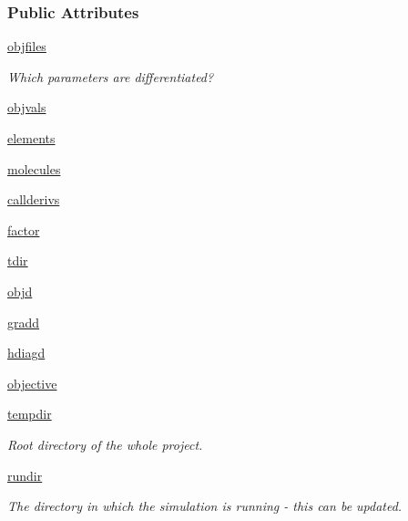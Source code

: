 \subsubsection*{\-Public \-Attributes}
\begin{DoxyCompactItemize}
\item 
\hyperlink{classforcebalance_1_1psi4io_1_1RDVR3__Psi4_af0a836ea0484e543c42795a4ac6f9aed}{objfiles}
\begin{DoxyCompactList}\small\item\em \-Which parameters are differentiated? \end{DoxyCompactList}\item 
\hyperlink{classforcebalance_1_1psi4io_1_1RDVR3__Psi4_ab49315aa4852cf9539f0f6f3a25c7318}{objvals}
\item 
\hyperlink{classforcebalance_1_1psi4io_1_1RDVR3__Psi4_ab845843d020ffd78521b595625fa56ef}{elements}
\item 
\hyperlink{classforcebalance_1_1psi4io_1_1RDVR3__Psi4_a42bd0c571fe52199a87c1130f918929b}{molecules}
\item 
\hyperlink{classforcebalance_1_1psi4io_1_1RDVR3__Psi4_a00806559809d8530de8733239a0b42d3}{callderivs}
\item 
\hyperlink{classforcebalance_1_1psi4io_1_1RDVR3__Psi4_aadc72cb33bd58393bbf7bd65498606c5}{factor}
\item 
\hyperlink{classforcebalance_1_1psi4io_1_1RDVR3__Psi4_af469dd1fbd5c2542892e914dfb077433}{tdir}
\item 
\hyperlink{classforcebalance_1_1psi4io_1_1RDVR3__Psi4_a95a4c3d2b32efcbe00be45b60910ea89}{objd}
\item 
\hyperlink{classforcebalance_1_1psi4io_1_1RDVR3__Psi4_a81fffe9a1474f8b3fcb1c96659042cdb}{gradd}
\item 
\hyperlink{classforcebalance_1_1psi4io_1_1RDVR3__Psi4_adb55e09408b1ed17b5087a5362f25b40}{hdiagd}
\item 
\hyperlink{classforcebalance_1_1psi4io_1_1RDVR3__Psi4_ac0fdf394c51593f6836b4b771be7e700}{objective}
\item 
\hyperlink{classforcebalance_1_1target_1_1Target_aede2856573b890cd47054ad36937d6f6}{tempdir}
\begin{DoxyCompactList}\small\item\em \-Root directory of the whole project. \end{DoxyCompactList}\item 
\hyperlink{classforcebalance_1_1target_1_1Target_a1da470037ef61c22dc44beb85cfa01a9}{rundir}
\begin{DoxyCompactList}\small\item\em \-The directory in which the simulation is running -\/ this can be updated. \end{DoxyCompactList}\item 

\end{DoxyCompactItemize}
